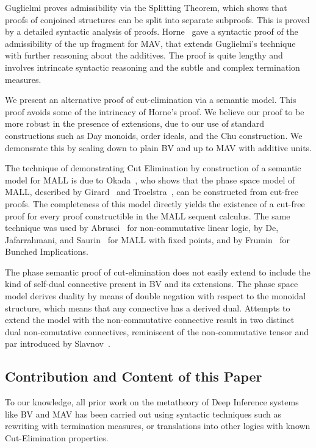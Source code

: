 Guglielmi \cite[\S4.1]{Guglielmi14:di} proves admissibility via the Splitting Theorem, which shows that proofs of conjoined structures can be split into separate subproofs. This is proved by a detailed syntactic analysis of proofs. Horne~\cite{Horne15:mav} gave a syntactic proof of the admissibility of the up fragment for MAV, that extends Guglielmi's technique with further reasoning about the additives. The proof is quite lengthy and involves intrincate syntactic reasoning and the subtle and complex termination measures.

We present an alternative proof of cut-elimination via a semantic model. This proof avoids some of the intrincacy of Horne's proof. We believe our proof to be more robust in the presence of extensions, due to our use of standard constructions such as Day monoids, order ideals, and the Chu construction. We demonsrate this by scaling down to plain BV and up to MAV with additive units.

The technique of demonstrating Cut Elimination by construction of a semantic model for MALL is due to Okada~\cite{Okada99:psc}, who shows that the phase space model of MALL, described by Girard~\cite[\S4.1]{Girard87:ll} and Troelstra~\cite[]{Troelstra92:lll}, can be constructed from cut-free proofs.
The completeness of this model directly yields the existence of a cut-free proof for every proof constructible in the MALL sequent calculus.
The same technique was used by Abrusci~\cite{Abrusci91:psc} for non-commutative linear logic, by De, Jafarrahmani, and Saurin~\cite{De22:psc} for MALL with fixed points, and by Frumin~\cite{Frumin22:psc} for Bunched Implications.

The phase semantic proof of cut-elimination does not easily extend to include the kind of self-dual connective present in BV and its extensions.
The phase space model derives duality by means of double negation with respect to the monoidal structure, which means that any connective has a derived dual. Attempts to extend the model with the non-commutative connective result in two distinct dual non-comutative connectives, reminiscent of the non-commutative tensor and par introduced by Slavnov~\cite{Slavnov19:scmll}.

\subsection{Contribution and Content of this Paper}

To our knowledge, all prior work on the metatheory of Deep Inference systems like BV and MAV has been carried out using syntactic techniques such as rewriting with termination measures, or translations into other logics with known Cut-Elimination properties.

